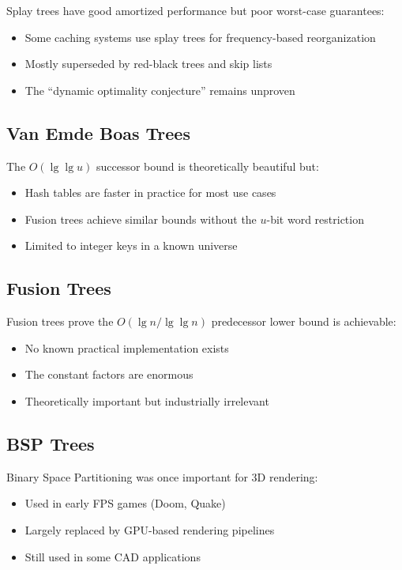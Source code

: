 Splay trees have good amortized performance but poor worst-case guarantees:
\begin{itemize}
    \item Some caching systems use splay trees for frequency-based reorganization
    \item Mostly superseded by red-black trees and skip lists
    \item The ``dynamic optimality conjecture'' remains unproven
\end{itemize}

\subsection{Van Emde Boas Trees}

The $O(\lg \lg u)$ successor bound is theoretically beautiful but:
\begin{itemize}
    \item Hash tables are faster in practice for most use cases
    \item Fusion trees achieve similar bounds without the $u$-bit word restriction
    \item Limited to integer keys in a known universe
\end{itemize}

\subsection{Fusion Trees}

Fusion trees prove the $O(\lg n / \lg \lg n)$ predecessor lower bound is achievable:
\begin{itemize}
    \item No known practical implementation exists
    \item The constant factors are enormous
    \item Theoretically important but industrially irrelevant
\end{itemize}

\subsection{BSP Trees}

Binary Space Partitioning was once important for 3D rendering:
\begin{itemize}
    \item Used in early FPS games (Doom, Quake)
    \item Largely replaced by GPU-based rendering pipelines
    \item Still used in some CAD applications
\end{itemize}

